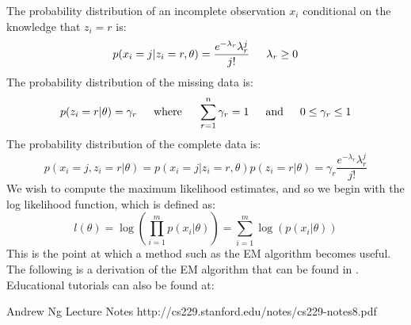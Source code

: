 \documentclass[letter,12pt]{article}
\begin{document}
The probability distribution of an incomplete observation $x_i$ conditional on the knowledge that $z_i=r$ is:
\[
p(x_i=j|z_i=r,\theta) = \frac{e^{-\lambda_r}\lambda_r^{j}}{j!}  
\indent
\lambda_r \geq 0
\]
The probability distribution of the missing data is:
\[
p(z_i=r|\theta) = \gamma_r
\indent
\text{where}
\indent 
\sum_{r=1}^{n}\gamma_r = 1
\indent
\text{and}
\indent 
0 \leq \gamma_r \leq 1
\]
The probability distribution of the complete data is:
\begin{equation} \label{eq_constraint}
p(x_i=j,z_i=r|\theta) 
= p(x_i=j|z_i=r,\theta)p(z_i=r|\theta) = \gamma_r\frac{e^{-\lambda_r}\lambda_r^{j}}{j!}
\end{equation}
We wish to compute the maximum likelihood estimates, and so we begin with the log likelihood function, which is defined as:
\[
l(\theta) = \log(\prod_{i=1}^{m}p(x_i|\theta)) = \sum_{i=1}^{m} \log(p(x_i|\theta))
\]
This is the point at which a method such as the EM algorithm becomes useful.  The following is a derivation of the EM algorithm that can be found in \cite{McLachlanKrishnanEM}.  Educational tutorials can also be found at:
\begin{list}{-}{}
\item Andrew Ng Lecture Notes  http://cs229.stanford.edu/notes/cs229-notes8.pdf
\item \cite{gentletutorial}
\end{list}
\end{document}
